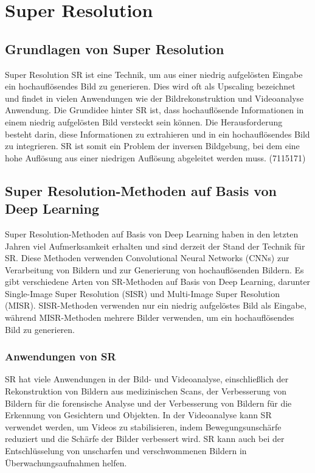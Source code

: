         

\section{Super Resolution}
    \subsection{Grundlagen von Super Resolution }
    
        Super Resolution \ac{SR} ist eine Technik, um aus einer niedrig aufgelösten Eingabe ein hochauflösendes Bild zu generieren.      
        Dies wird oft als Upscaling bezeichnet und findet in vielen Anwendungen wie der Bildrekonstruktion und Videoanalyse Anwendung.
        Die Grundidee hinter SR ist, dass hochauflösende Informationen in einem niedrig aufgelösten Bild versteckt sein können.      
        Die Herausforderung besteht darin, diese Informationen zu extrahieren und in ein hochauflösendes Bild zu integrieren.      
        SR ist somit ein Problem der inversen Bildgebung, bei dem eine hohe Auflösung aus einer niedrigen Auflösung abgeleitet werden muss.
        \footfullcite(7115171)
        
    \subsection{Super Resolution-Methoden auf Basis von Deep Learning}
    
        Super Resolution-Methoden auf Basis von Deep Learning haben in den letzten Jahren viel Aufmerksamkeit erhalten und sind derzeit der Stand der Technik für SR.      
        Diese Methoden verwenden Convolutional Neural Networks (CNNs) zur Verarbeitung von Bildern und zur Generierung von hochauflösenden Bildern.
        Es gibt verschiedene Arten von SR-Methoden auf Basis von Deep Learning, darunter Single-Image Super Resolution (SISR) und Multi-Image Super Resolution (MISR).      
        SISR-Methoden verwenden nur ein niedrig aufgelöstes Bild als Eingabe, während MISR-Methoden mehrere Bilder verwenden, um ein hochauflösendes Bild zu generieren.
    
    \subsubsection{Anwendungen von SR}
    
        SR hat viele Anwendungen in der Bild- und Videoanalyse, einschließlich der Rekonstruktion von Bildern aus medizinischen Scans, der Verbesserung von Bildern für die forensische Analyse und der Verbesserung von Bildern für die Erkennung von Gesichtern und Objekten.
        In der Videoanalyse kann SR verwendet werden, um Videos zu stabilisieren, indem Bewegungsunschärfe reduziert und die Schärfe der Bilder verbessert wird.      
        SR kann auch bei der Entschlüsselung von unscharfen und verschwommenen Bildern in Überwachungsaufnahmen helfen.
    
